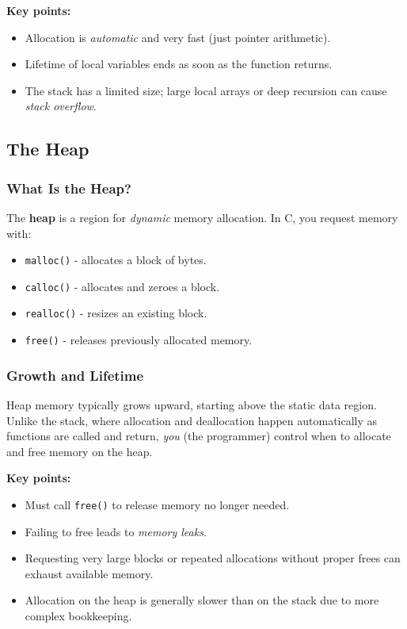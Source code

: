 \documentclass[a4paper,12pt]{article}
\begin{document}
\textbf{Key points:}
\begin{itemize}
  \item Allocation is \emph{automatic} and very fast (just pointer arithmetic).
  \item Lifetime of local variables ends as soon as the function returns.
  \item The stack has a limited size; large local arrays or deep recursion can cause \emph{stack overflow}.
\end{itemize}

\subsection{The Heap}
\subsubsection{What Is the Heap?}
The \textbf{heap} is a region for \emph{dynamic} memory allocation. In C, you request memory with:
\begin{itemize}
    \item \texttt{malloc()} - allocates a block of bytes.
    \item \texttt{calloc()} - allocates and zeroes a block.
    \item \texttt{realloc()} - resizes an existing block.
    \item \texttt{free()} - releases previously allocated memory.
\end{itemize}

\subsubsection{Growth and Lifetime}
Heap memory typically grows upward, starting above the static data region. Unlike the stack, where allocation and deallocation happen automatically as functions are called and return, \emph{you} (the programmer) control when to allocate and free memory on the heap.

\textbf{Key points:}
\begin{itemize}
  \item Must call \texttt{free()} to release memory no longer needed.
  \item Failing to free leads to \emph{memory leaks}.
  \item Requesting very large blocks or repeated allocations without proper frees can exhaust available memory.
  \item Allocation on the heap is generally slower than on the stack due to more complex bookkeeping.
\end{itemize}
\end{document}
